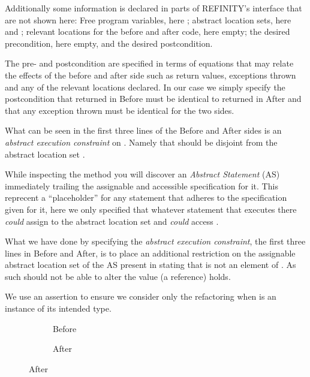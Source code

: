Additionally some information is declared in parts of REFINITY's interface that are not shown here:
Free program variables, here ; abstract location sets, here  and ; relevant locations for the before and after code, here empty;
the desired precondition, here empty, and the desired postcondition.

The pre- and postcondition are specified in terms of equations that may relate the effects of the before and after side such as return values, exceptions thrown and any
of the relevant locations declared.
In our case we simply specify the postcondition that  returned in Before must be identical to  returned in After and that any exception thrown must be identical for the two sides.

What can be seen in the first three lines of the Before and After sides is an \emph{abstract execution constraint} on .
Namely that  should be disjoint from the abstract location set .

While inspecting the method  you will discover an \emph{Abstract Statement} (AS)  immediately trailing the assignable and accessible specification for it.
This reprecent a ``placeholder'' for any statement that adheres to the specification given for it, here we only specified that whatever statement that executes there \emph{could} assign to the abstract
location set  and \emph{could} access .

What we have done by specifying the \emph{abstract execution constraint}, the first three lines in Before and After, is to place an additional restriction on the assignable abstract
location set  of the AS present in  stating that  is not an element of . As such  should not be able to alter the value (a reference)
 holds.

We use an assertion to ensure we consider only the refactoring when  is an instance of its intended type.

\begin{figure}[!h]
  \centering
  \begin{subfigure}[b]{.34\linewidth}
    
    \vspace{-2mm}
    \caption{Before}
    \label{lst:ExtractVariable-refinity-before}
  \end{subfigure}\hspace{1cm}
  \begin{subfigure}[b]{.34\linewidth}
    
    \vspace{-2mm}
    \caption{After}
    \label{lst:ExtractVariable-refinity-after}
  \end{subfigure}\vspace{4mm}
\label{lst:ExtractVariable-refinity}
\end{figure}

